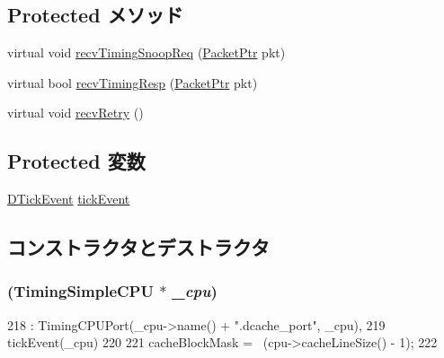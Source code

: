 \subsection*{Protected メソッド}
\begin{DoxyCompactItemize}
\item 
virtual void \hyperlink{classTimingSimpleCPU_1_1DcachePort_aff3031c56fc4947a19695c868bb8233e}{recvTimingSnoopReq} (\hyperlink{classPacket}{PacketPtr} pkt)
\item 
virtual bool \hyperlink{classTimingSimpleCPU_1_1DcachePort_a482dba5588f4bee43e498875a61e5e0b}{recvTimingResp} (\hyperlink{classPacket}{PacketPtr} pkt)
\item 
virtual void \hyperlink{classTimingSimpleCPU_1_1DcachePort_a29cb5a4f98063ce6e9210eacbdb35298}{recvRetry} ()
\end{DoxyCompactItemize}
\subsection*{Protected 変数}
\begin{DoxyCompactItemize}
\item 
\hyperlink{structTimingSimpleCPU_1_1DcachePort_1_1DTickEvent}{DTickEvent} \hyperlink{classTimingSimpleCPU_1_1DcachePort_a49142331c4285494b26819ad5d97f545}{tickEvent}
\end{DoxyCompactItemize}


\subsection{コンストラクタとデストラクタ}
\hypertarget{classTimingSimpleCPU_1_1DcachePort_ae1acfc6b442a828753a2311f1325cec5}{
\subsubsection[{DcachePort}]{ ({\bf TimingSimpleCPU} $\ast$ {\em \_\-cpu})}}
\label{classTimingSimpleCPU_1_1DcachePort_ae1acfc6b442a828753a2311f1325cec5}



\begin{DoxyCode}
218             : TimingCPUPort(_cpu->name() + ".dcache_port", _cpu),
219               tickEvent(_cpu)
220         {
221            cacheBlockMask = ~(cpu->cacheLineSize() - 1);
222         }
\end{DoxyCode}


